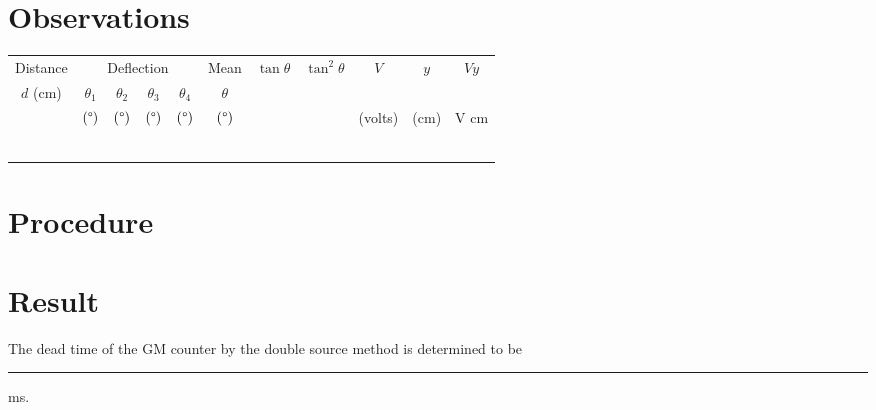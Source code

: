 \documentclass[12pt,a4paper]{article}
\begin{document}
		\section{Observations}
		\begin{center}
			\begin{tabular}{|c|c|c|c|c|c|c|c|c|c|c|}
				\hline
				\rowcolor{b1!50}Distance&	\multicolumn{4}{c|}{Deflection}&	Mean&	$\tan\theta$&	$\tan^{2}\theta$&	$V$&	$y$&	$Vy$\\ \cline{2-5}
				\rowcolor{b1!50}$d$ (cm)&	$\theta_1$&	$\theta_2$&	$\theta_3$&	$\theta_4$&	$\theta$&	&	&	&	&	\\
				\rowcolor{b1!50}&	$(\degree)$&	$(\degree)$&	$(\degree)$&	$(\degree)$&	$(\degree)$&	&&(volts)&	(cm)&	V cm\\ \hline
				&&&&&&&&&& \\ \hline
				&&&&&&&&&& \\ \hline
				&&&&&&&&&& \\ \hline
				&&&&&&&&&& \\ \hline
				&&&&&&&&&& \\ \hline
				&&&&&&&&&& \\ \hline
				
			\end{tabular}
		\end{center}
	
	\section{Procedure}
	
	\section{Result}
	
		The dead time of the GM counter by the double source method is determined to be \rule{20ex}{0.2pt}ms.
\end{document}
